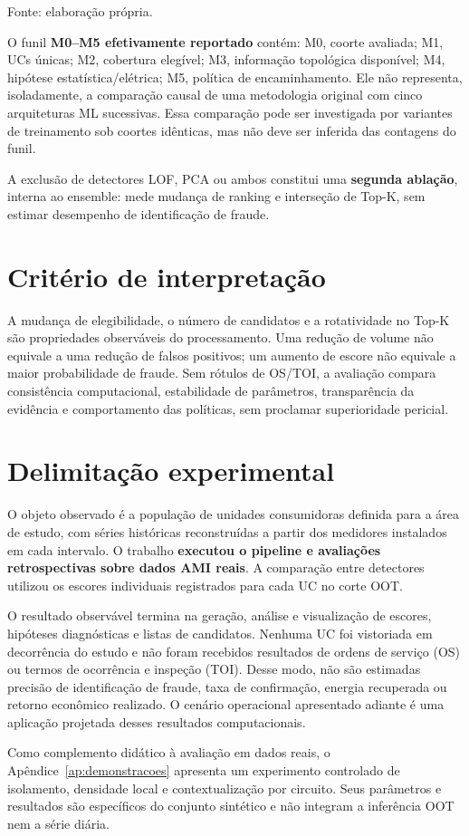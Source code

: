 {\small\noindent Fonte: elaboração própria.\par}


O funil \textbf{M0--M5 efetivamente reportado} contém: M0, coorte avaliada; M1, UCs únicas; M2, cobertura elegível; M3, informação topológica disponível; M4, hipótese estatística/elétrica; M5, política de encaminhamento. Ele não representa, isoladamente, a comparação causal de uma metodologia original com cinco arquiteturas ML sucessivas. Essa comparação pode ser investigada por variantes de treinamento sob coortes idênticas, mas não deve ser inferida das contagens do funil.

A exclusão de detectores LOF, PCA ou ambos constitui uma \textbf{segunda ablação}, interna ao ensemble: mede mudança de ranking e interseção de Top-K, sem estimar desempenho de identificação de fraude.

\section{Critério de interpretação}\label{crituxe9rio-de-interpretauxe7uxe3o}

A mudança de elegibilidade, o número de candidatos e a rotatividade no Top-K são propriedades observáveis do processamento. Uma redução de volume não equivale a uma redução de falsos positivos; um aumento de escore não equivale a maior probabilidade de fraude. Sem rótulos de OS/TOI, a avaliação compara consistência computacional, estabilidade de parâmetros, transparência da evidência e comportamento das políticas, sem proclamar superioridade pericial.

\section{Delimitação experimental}\label{delimitacao-experimental}

O objeto observado é a população de unidades consumidoras definida para a área de estudo, com séries históricas reconstruídas a partir dos medidores instalados em cada intervalo. O trabalho \textbf{executou o pipeline e avaliações retrospectivas sobre dados AMI reais}. A comparação entre detectores utilizou os escores individuais registrados para cada UC no corte OOT.

O resultado observável termina na geração, análise e visualização de escores, hipóteses diagnósticas e listas de candidatos. Nenhuma UC foi vistoriada em decorrência do estudo e não foram recebidos resultados de ordens de serviço (OS) ou termos de ocorrência e inspeção (TOI). Desse modo, não são estimadas precisão de identificação de fraude, taxa de confirmação, energia recuperada ou retorno econômico realizado. O cenário operacional apresentado adiante é uma aplicação projetada desses resultados computacionais.

Como complemento didático à avaliação em dados reais, o Apêndice~\ref{ap:demonstracoes} apresenta um experimento controlado de isolamento, densidade local e contextualização por circuito. Seus parâmetros e resultados são específicos do conjunto sintético e não integram a inferência OOT nem a série diária.
